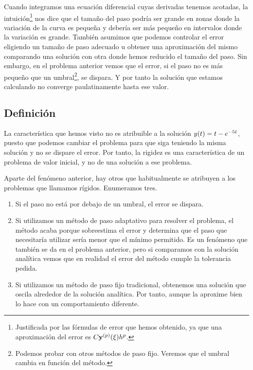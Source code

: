Cuando integramos una ecuación diferencial cuyas derivadas tenemos acotadas,
la intuición\footnote{
    Justificada por las fórmulas de error que hemos obtenido,
    ya que una aproximación del error es $C\vb{y}{}^{(p)}(\xi)h^p$.
}
nos dice que el tamaño del paso
podría ser grande en zonas donde la variación de la curva es pequeña
y debería ser más pequeño en intervalos donde la variación es grande.
También asumimos que podemos controlar el error
eligiendo un tamaño de paso adecuado u
obtener una aproximación del mismo
comparando una solución con otra donde hemos reducido el tamaño del paso.
Sin embargo, en el problema anterior vemos que el error,
si el paso no es más pequeño que un umbral\footnote{
    Podemos probar con otros métodos de paso fijo.
    Veremos que el umbral cambia en función del método.
},
se dispara.
Y por tanto la solución que estamos calculando
no converge paulatinamente hasta ese valor.

\subsection{Definición}

La característica que hemos visto no es atribuible a la solución
$y(t) = t - e^{-5t}$,
puesto que podemos cambiar el problema para que siga teniendo la misma solución
y no se dispare el error.
Por tanto, la rigidez es una característica de un problema de valor inicial,
y no de una solución a ese problema.

Aparte del fenómeno anterior,
hay otros que habitualmente se atribuyen a los problemas que llamamos rígidos.
Enumeramos tres.
\begin{enumerate}
    \item Si el paso no está por debajo de un umbral,
    el error se dispara.
    \item Si utilizamos un método de paso adaptativo para resolver el problema,
    el método acaba porque sobreestima el error y determina que
    el paso que necesitaría utilizar sería menor que el mínimo permitido.
    Es un fenómeno que también se da en el problema anterior,
    pero si comparamos con la solución analítica vemos que en realidad
    el error del método cumple la tolerancia pedida.
    \item Si utilizamos un método de paso fijo tradicional,
    obtenemos una solución que oscila alrededor de la solución analítica.
    Por tanto, aunque la aproxime bien lo hace con un comportamiento diferente.
\end{enumerate}


